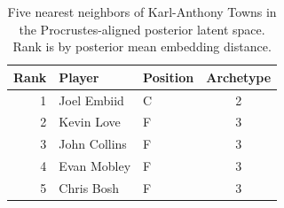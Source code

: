 \begin{table}[htbp]
  \centering\small
  \begin{tabular}{rllc}
    \toprule
    Rank & Player & Position & Archetype \\
    \midrule
    1 & Joel Embiid & C & 2 \\
    2 & Kevin Love & F & 3 \\
    3 & John Collins & F & 3 \\
    4 & Evan Mobley & F & 3 \\
    5 & Chris Bosh & F & 3 \\
    \bottomrule
  \end{tabular}
  \caption{Five nearest neighbors of Karl-Anthony Towns in the Procrustes-aligned posterior latent space. Rank is by posterior mean embedding distance.}
  \label{tab:Karl_Anthony_Towns_neighbors}
\end{table}


